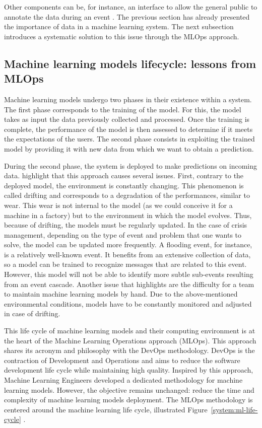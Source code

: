 Other components can be, for instance, an interface to allow the general public to annotate the data during an event \parencite{imranAIDRArtificialIntelligence2014}.
The previous section has already presented the importance of data in a machine learning system.
The next subsection introduces a systematic solution to this issue through the MLOps approach.

\subsection{Machine learning models lifecycle: lessons from MLOps}
Machine learning models undergo two phases in their existence within a system.
The first phase corresponds to the training of the model.
For this, the model takes as input the data previously collected and processed.
Once the training is complete, the performance of the model is then assessed to determine if it meets the expectations of the users.
The second phase consists in exploiting the trained model by providing it with new data from which we want to obtain a prediction.

During the second phase, the system is deployed to make predictions on incoming data.
\textcite[Chapter~1]{treveilIntroducingMLOps2020} highlight that this approach causes several issues.
First, contrary to the deployed model, the environment is constantly changing.
This phenomenon is called drifting and corresponds to a degradation of the performances, similar to wear.
This wear is not internal to the model (as we could conceive it for a machine in a factory) but to the environment in which the model evolves.
Thus, because of drifting, the models must be regularly updated.
In the case of crisis management, depending on the type of event and problem that one wants to solve, the model can be updated more frequently.
A flooding event, for instance, is a relatively well-known event.
It benefits from an extensive collection of data, so a model can be trained to recognize messages that are related to this event.
However, this model will not be able to identify more subtle sub-events resulting from an event cascade.
Another issue that \citeauthor{treveilIntroducingMLOps2020} highlights are the difficulty for a team to maintain machine learning models by hand.
Due to the above-mentioned environmental conditions, models have to be constantly monitored and adjusted in case of drifting.

This life cycle of machine learning models and their computing environment is at the heart of the Machine Learning Operations approach (MLOps).
This approach shares its acronym and philosophy with the DevOps methodology.
DevOps is the contraction of Development and Operations and aims to reduce the software development life cycle while maintaining high quality.
Inspired by this approach, Machine Learning Engineers developed a dedicated methodology for machine learning models.
However, the objective remains unchanged: reduce the time and complexity of machine learning models deployment.
The MLOps methodology is centered around the machine learning life cycle, illustrated Figure~\ref{system:ml-life-cycle} \parencite{treveilIntroducingMLOps2020,burkovMachineLearningEngineering2020}.

